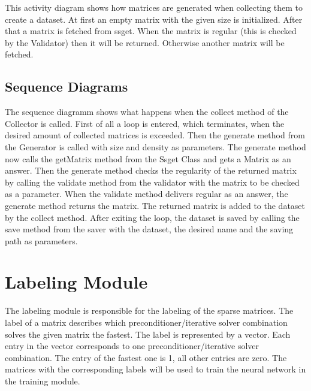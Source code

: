 \documentclass[parskip=full]{scrartcl}
\begin{document}
This activity diagram shows how matrices are generated when collecting them to create a dataset.
At first an empty matrix with the given size is initialized.
After that a matrix is fetched from ssget. When the matrix is regular (this is checked by the Validator) then it will be returned.
Otherwise another matrix will be fetched.

\subsection{Sequence Diagrams}

The sequence diagramm shows what happens when the collect method of the Collector is called. First of all a loop is entered, which terminates, when the desired amount of collected matrices is exceeded. Then the generate method from the Generator is called with size and density as parameters. The generate method now calls the getMatrix method from the Ssget Class and gets a Matrix as an answer. Then the generate method checks the regularity of the returned matrix by calling the validate method from the validator with the matrix to be checked as a parameter. When the validate method delivers  regular as an answer, the generate method returns the matrix. The returned matrix is added to the dataset by the collect method. After exiting the loop, the dataset is saved by calling the save method from the saver with the dataset, the desired name and the saving path as parameters.


\newpage
\begin{figure}[h]
\begin{center}

\label{Sequence Diagram}
\end{center}
\end{figure}
\newpage


\section{Labeling Module}
The labeling module is responsible for the labeling of the sparse matrices.
The \gls{label} of a matrix describes which \gls{preconditioner}/\gls{iterative solver} combination solves the given matrix the fastest.
The \gls{label} is represented by a vector.
Each entry in the vector corresponds to one \gls{preconditioner}/\gls{iterative solver} combination.
The entry of the fastest one is 1, all other entries are zero.
The matrices with the corresponding \glspl{label} will be used to train the \gls{neural network} in the training module.
\end{document}
